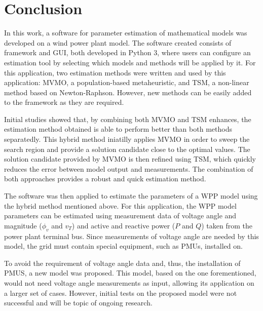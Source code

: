 \chapter{Conclusion}
\label{ch: Conclusion}

In this work, a software for parameter estimation of mathematical models was developed on a wind power plant model. The software created consists of framework and GUI, both developed in Python 3, where users can configure an estimation tool by selecting which models and methods will be applied by it. For this application, two estimation methods were written and used by this application: MVMO, a population-based metaheuristic, and TSM, a non-linear method based on Newton-Raphson. However, new methods can be easily added to the framework as they are required.

Initial studies showed that, by combining both MVMO and TSM enhances, the estimation method obtained is able to perform better than both methods separatedly. This hybrid method iniatilly applies MVMO in order to sweep the search region and provide a solution candidate close to the optimal values. The solution candidate provided by MVMO is then refined using TSM, which quickly reduces the error between model output and measurements. The combination of both approaches provides a robust and quick estimation method.

The software was then applied to estimate the parameters of a WPP model using the hybrid method mentioned above. For this application, the WPP model parameters can be estimated using measurement data of voltage angle and magnitude ($\phi_{v}$ and $v_{T}$) and active and reactive power ($P$ and $Q$) taken from the power plant terminal bus. Since measurements of voltage angle are needed by this model, the grid must contain special equipment, such as PMUs, installed on.

To avoid the requirement of voltage angle data and, thus, the installation of PMUS, a new model was proposed. This model, based on the one forementioned, would not need voltage angle measurements as input, allowing its application on a larger set of cases. However, initial tests on the proposed model were not successful and will be topic of ongoing research.